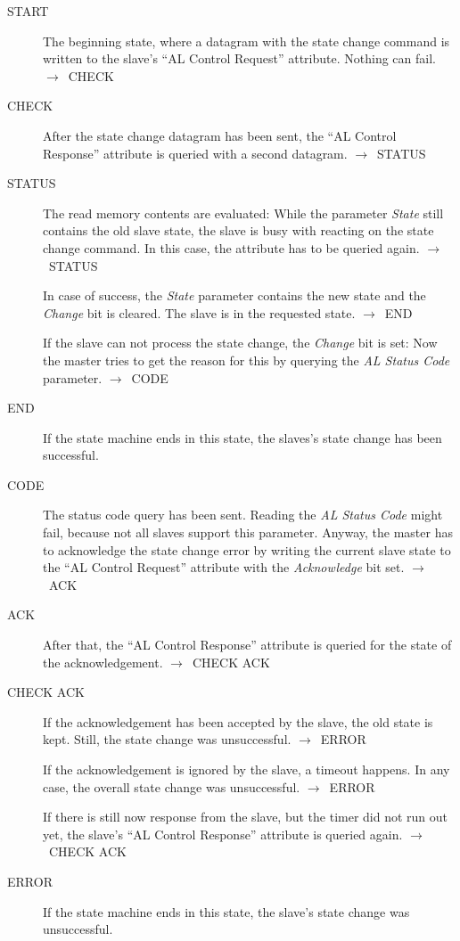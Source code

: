 \documentclass[a4paper,12pt,BCOR6mm,bibtotoc,idxtotoc]{scrbook}
\begin{document}
\begin{description}
\item[START] The beginning state, where a datagram with the state
  change command is written to the slave's ``AL Control Request''
  attribute. Nothing can fail. $\rightarrow$~CHECK

\item[CHECK] After the state change datagram has been sent, the ``AL
  Control Response'' attribute is queried with a second datagram.
  $\rightarrow$~STATUS

\item[STATUS] The read memory contents are evaluated: While the
  parameter \textit{State} still contains the old slave state, the
  slave is busy with reacting on the state change command. In this
  case, the attribute has to be queried again.
  $\rightarrow$~STATUS

  In case of success, the \textit{State} parameter contains the new
  state and the \textit{Change} bit is cleared. The slave is in the
  requested state.  $\rightarrow$~END

  If the slave can not process the state change, the \textit{Change}
  bit is set: Now the master tries to get the reason for this by
  querying the \textit{AL Status Code} parameter.
  $\rightarrow$~CODE

\item[END] If the state machine ends in this state, the slaves's state
  change has been successful.

\item[CODE] The status code query has been sent. Reading the
  \textit{AL Status Code} might fail, because not all slaves support
  this parameter. Anyway, the master has to acknowledge the state
  change error by writing the current slave state to the ``AL Control
  Request'' attribute with the \textit{Acknowledge} bit set.
  $\rightarrow$~ACK

\item[ACK] After that, the ``AL Control Response'' attribute is
  queried for the state of the acknowledgement.
  $\rightarrow$~CHECK ACK

\item[CHECK ACK] If the acknowledgement has been accepted by the
  slave, the old state is kept. Still, the state change was
  unsuccessful. $\rightarrow$~ERROR

  If the acknowledgement is ignored by the slave, a timeout happens.
  In any case, the overall state change was unsuccessful.
  $\rightarrow$~ERROR

  If there is still now response from the slave, but the timer did not
  run out yet, the slave's ``AL Control Response'' attribute is
  queried again.  $\rightarrow$~CHECK ACK

\item[ERROR] If the state machine ends in this state, the slave's
  state change was unsuccessful.

\end{description}
\end{document}
